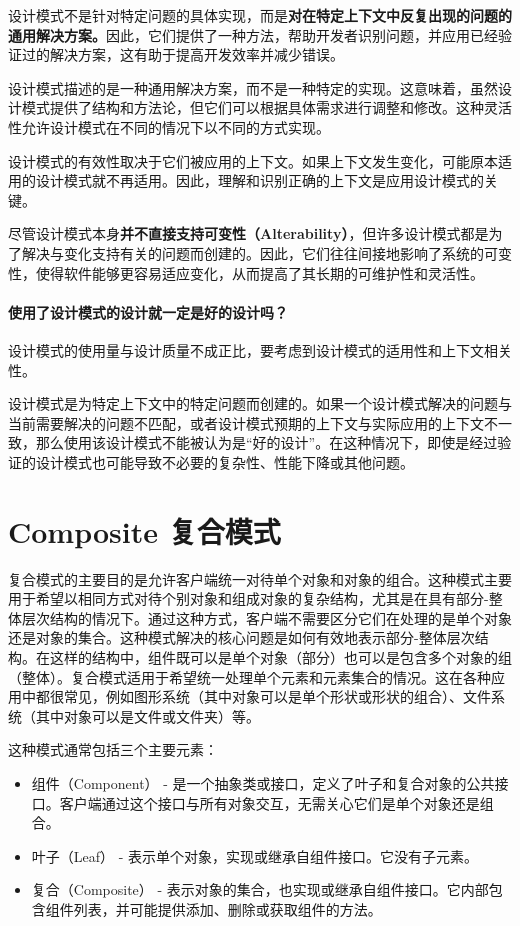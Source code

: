 设计模式不是针对特定问题的具体实现，而是\textbf{对在特定上下文中反复出现的问题的通用解决方案。}因此，它们提供了一种方法，帮助开发者识别问题，并应用已经验证过的解决方案，这有助于提高开发效率并减少错误。

设计模式描述的是一种通用解决方案，而不是一种特定的实现。这意味着，虽然设计模式提供了结构和方法论，但它们可以根据具体需求进行调整和修改。这种灵活性允许设计模式在不同的情况下以不同的方式实现。

设计模式的有效性取决于它们被应用的上下文。如果上下文发生变化，可能原本适用的设计模式就不再适用。因此，理解和识别正确的上下文是应用设计模式的关键。

尽管设计模式本身\textbf{并不直接支持可变性（Alterability）}，但许多设计模式都是为了解决与变化支持有关的问题而创建的。因此，它们往往间接地影响了系统的可变性，使得软件能够更容易适应变化，从而提高了其长期的可维护性和灵活性。


\paragraph{使用了设计模式的设计就一定是好的设计吗？}设计模式的使用量与设计质量不成正比，要考虑到设计模式的适用性和上下文相关性。

设计模式是为特定上下文中的特定问题而创建的。如果一个设计模式解决的问题与当前需要解决的问题不匹配，或者设计模式预期的上下文与实际应用的上下文不一致，那么使用该设计模式不能被认为是“好的设计”。在这种情况下，即使是经过验证的设计模式也可能导致不必要的复杂性、性能下降或其他问题。

\section{Composite 复合模式}

复合模式的主要目的是允许客户端统一对待单个对象和对象的组合。这种模式主要用于希望以相同方式对待个别对象和组成对象的复杂结构，尤其是在具有部分-整体层次结构的情况下。通过这种方式，客户端不需要区分它们在处理的是单个对象还是对象的集合。这种模式解决的核心问题是如何有效地表示部分-整体层次结构。在这样的结构中，组件既可以是单个对象（部分）也可以是包含多个对象的组（整体）。复合模式适用于希望统一处理单个元素和元素集合的情况。这在各种应用中都很常见，例如图形系统（其中对象可以是单个形状或形状的组合）、文件系统（其中对象可以是文件或文件夹）等。


这种模式通常包括三个主要元素：
\begin{itemize}
	\item 组件（Component） - 是一个抽象类或接口，定义了叶子和复合对象的公共接口。客户端通过这个接口与所有对象交互，无需关心它们是单个对象还是组合。
	\item 叶子（Leaf） - 表示单个对象，实现或继承自组件接口。它没有子元素。
	\item 复合（Composite） - 表示对象的集合，也实现或继承自组件接口。它内部包含组件列表，并可能提供添加、删除或获取组件的方法。
	
\end{itemize}

